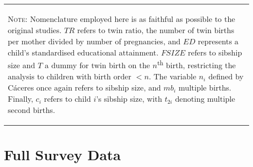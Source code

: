 \documentclass{article}[11pt,subeqn]
\begin{document}
\begin{spacing}{1.25}
\begin{center}
\begin{rotate}{90}
\begin{tabular}{lp{4mm}lll}
\bottomrule 
\multicolumn{5}{p{19.2cm}}{\setstretch{0.9}\begin{footnotesize}\textsc{Note:} Nomenclature employed here is as faithful as possible to the original studies.  $TR$ refers to twin ratio, the number of twin births per mother divided by number of pregnancies, and $ED$ represents a child's standardised educational attainment. $FSIZE$ refers to sibship size and $T$ a dummy for twin birth on the $n$\textsuperscript{th} birth, restricting the analysis to children with birth order $<n$. The variable $n_i$ defined by C\'aceres once again refers to sibship size, and $mb_i$ multiple births. Finally, $c_i$ refers to child $i$'s sibship size, with $t_{2i}$ denoting multiple second births.\end{footnotesize}}\\
\end{tabular}
\end{rotate}
\label{tab:litrev}
\end{center}

\section{Full Survey Data}
\label{scn:surveys}


\end{spacing}
\end{document}

